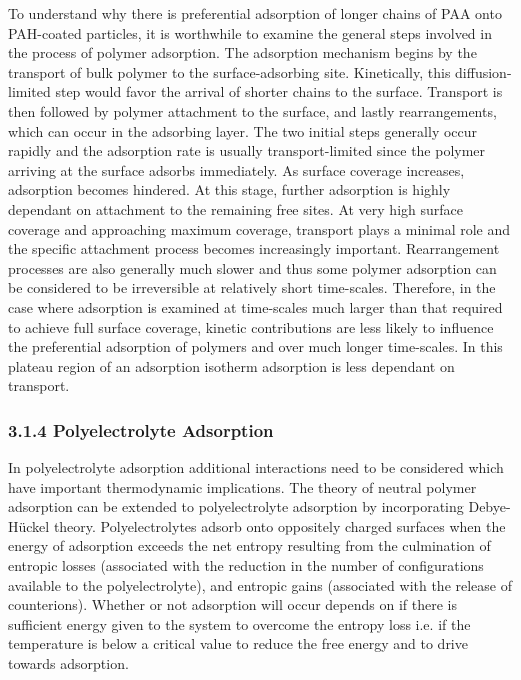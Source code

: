 \documentclass[journal=mamobx,manuscript=article]{achemso}
\begin{document}
To understand why there is preferential adsorption of longer chains of PAA onto PAH-coated particles, it is worthwhile to examine the general steps involved in the process of polymer adsorption.  The adsorption mechanism begins by the transport of bulk polymer to the surface-adsorbing site.  Kinetically, this diffusion-limited step would favor the arrival of shorter chains to the surface.  Transport is then followed by polymer attachment to the surface, and lastly rearrangements, which can occur in the adsorbing layer.  The two initial steps generally occur rapidly and the adsorption rate is usually transport-limited since the polymer arriving at the surface adsorbs immediately.\cite{Dijt1990} As surface coverage increases, adsorption becomes hindered.  At this stage, further adsorption is highly dependant on attachment to the remaining free sites.\cite{Hoogeveen1996}  At very high surface coverage and approaching maximum coverage, transport plays a minimal role and the specific attachment process becomes increasingly important.\cite{Hoogeveen1996} Rearrangement processes are also generally much slower and thus some polymer adsorption can be considered to be irreversible at relatively short time-scales.\cite{Cafe1982,Meadows1988}  Therefore, in the case where adsorption is examined at time-scales much larger than that required to achieve full surface coverage, kinetic contributions are less likely to influence the preferential adsorption of polymers and over much longer time-scales.  In this plateau region of an adsorption isotherm adsorption is less dependant on transport.\cite{Hoogeveen1996}



\subsubsection{3.1.4 Polyelectrolyte Adsorption}  %
    \label{sec-polyads}

In polyelectrolyte adsorption additional interactions need to be considered which have important thermodynamic implications. The theory of neutral polymer adsorption can be extended to polyelectrolyte adsorption by incorporating Debye-H\"uckel theory.\cite{Chatellier1996}  Polyelectrolytes adsorb onto oppositely charged surfaces when the energy of adsorption exceeds the net entropy resulting from the culmination of entropic losses (associated with the reduction in the number of configurations available to the polyelectrolyte), and entropic gains (associated with the release of counterions).  Whether or not adsorption will occur depends on if there is sufficient energy given to the system to overcome the entropy loss i.e. if the temperature is below a critical value to reduce the free energy and to drive towards adsorption.
\end{document}
